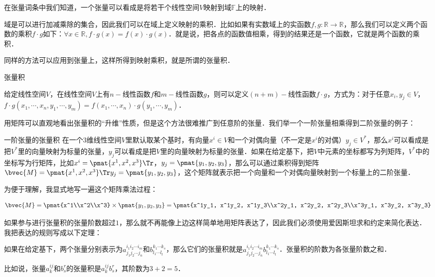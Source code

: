 
在张量词条中我们知道，一个张量可以看成是将若干个线性空间$V$映射到域$\mathbb{F}$上的映射．

域是可以进行加减乘除的集合，因此我们可以在域上定义映射的乘积．比如如果有实数域上的实函数$f, g:\mathbb{R}\rightarrow\mathbb{R}$，那么我们可以定义两个函数的乘积$f\cdot g$如下：$\forall x\in\mathbb{R}, f\cdot g(x)=f(x)\cdot g(x)$．就是说，把各点的函数值相乘，得到的结果还是一个函数，它就是两个函数的乘积．

同样的方法可以应用到张量上，这样所得到映射乘积，就是所谓的张量积．

\begin{definition}{张量积}

给定线性空间$V$，在线性空间$V$上有$n-$线性函数$f$和$m-$线性函数$g$，则可以定义$(n+m)-$线性函数$f\cdot g$，方式为：对于任意$x_i, y_j\in V$，$f\cdot g(x_1, \cdots, x_n, y_1, \cdots, y_m)=f(x_1, \cdots, x_n)\cdot g(y_1, \cdots, y_m)$．

\end{definition}

用矩阵可以直观地看出张量积的“升维”性质，但是这个方法很难推广到任意阶的张量．我们举一个一阶张量相乘得到二阶张量的例子：

\begin{example}{一阶张量的张量积}
在一个$3$维线性空间$V$里默认取某个基时，有向量$x^i\in V$和一个对偶向量（不一定是$x^i$的对偶）$y_j\in V^*$，那么$x^i$可以看成是把$V^*$里的向量映射为标量的张量，$y_j$可以看成是把$V$里的向量映射为标量的张量．如果在给定基下，把$V$中元素的坐标都写为列矩阵，$V^*$中的坐标写为行矩阵，比如$x^i=\pmat{x^1, x^2, x^3}\Tr$，$y_j=\pmat{y_1, y_2, y_3}$，那么可以通过乘积得到矩阵$\bvec{M}=\pmat{x^1, x^2, x^3}\Tr y_j=\pmat{y_1, y_2, y_3}$，这个矩阵就表示把一个向量和一个对偶向量映射到一个标量上的二阶张量．

为便于理解，我显式地写一遍这个矩阵乘法过程：

\begin{equation}
\bvec{M}=\pmat{x^1\\x^2\\x^3}\times\pmat{y_1, y_2, y_3}=\pmat{x^1y_1, x^1y_2, x^1y_3\\x^2y_1, x^2y_2, x^2y_3\\x^3y_1, x^3y_2, x^3y_3}
\end{equation}
\end{example}

如果参与进行张量积的张量阶数超过$1$，那么就不再能像上边这样简单地用矩阵表达了，因此我们必须使用爱因斯坦求和约定来简化表达．我把表达的规则写成以下定理：

\begin{theorem}{}
如果在给定基下，两个张量分别表示为$a^{i_1i_2\cdots i_m}_{j_1j_2\cdots j_n}$和$b^{k_1\cdots k_s}_{l_1\cdots l_t}$，那么它们的张量积就是$a^{i_1i_2\cdots i_m}_{j_1j_2\cdots j_n}b^{k_1\cdots k_s}_{l_1\cdots l_t}$．张量积的阶数为各张量阶数之和．
\end{theorem}

比如说，张量$a^{ij}_k$和$b^r_s$的张量积是$a^{ij}_kb^r_s$，其阶数为$3+2=5$．






